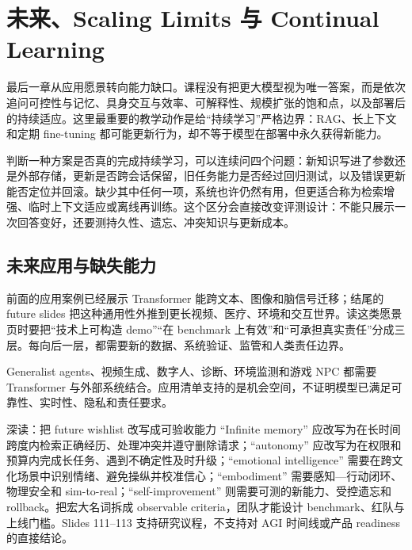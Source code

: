 \section{未来、Scaling Limits 与 Continual Learning}

最后一章从应用愿景转向能力缺口。课程没有把更大模型视为唯一答案，而是依次追问可控性与记忆、具身交互与效率、可解释性、规模扩张的饱和点，以及部署后的持续适应。这里最重要的教学动作是给“持续学习”严格边界：RAG、长上下文和定期 fine-tuning 都可能更新行为，却不等于模型在部署中永久获得新能力。

判断一种方案是否真的完成持续学习，可以连续问四个问题：新知识写进了参数还是外部存储，更新是否跨会话保留，旧任务能力是否经过回归测试，以及错误更新能否定位并回滚。缺少其中任何一项，系统也许仍然有用，但更适合称为检索增强、临时上下文适应或离线再训练。这个区分会直接改变评测设计：不能只展示一次回答变好，还要测持久性、遗忘、冲突知识与更新成本。

\subsection{未来应用与缺失能力}

前面的应用案例已经展示 Transformer 能跨文本、图像和脑信号迁移；结尾的 future slides 把这种通用性外推到更长视频、医疗、环境和交互世界。读这类愿景页时要把“技术上可构造 demo”“在 benchmark 上有效”和“可承担真实责任”分成三层。每向后一层，都需要新的数据、系统验证、监管和人类责任边界。

Generalist agents、视频生成、数字人、诊断、环境监测和游戏 NPC 都需要 Transformer 与外部系统结合。应用清单支持的是机会空间，不证明模型已满足可靠性、实时性、隐私和责任要求。







\begin{knowledgebox}{深读：把 future wishlist 改写成可验收能力}
``Infinite memory'' 应改写为在长时间跨度内检索正确经历、处理冲突并遵守删除请求；``autonomy'' 应改写为在权限和预算内完成长任务、遇到不确定性及时升级；``emotional intelligence'' 需要在跨文化场景中识别情绪、避免操纵并校准信心；``embodiment'' 需要感知—行动闭环、物理安全和 sim-to-real；``self-improvement'' 则需要可测的新能力、受控遗忘和 rollback。把宏大名词拆成 observable criteria，团队才能设计 benchmark、红队与上线门槛。Slides 111--113 支持研究议程，不支持对 AGI 时间线或产品 readiness 的直接结论。
\end{knowledgebox}

